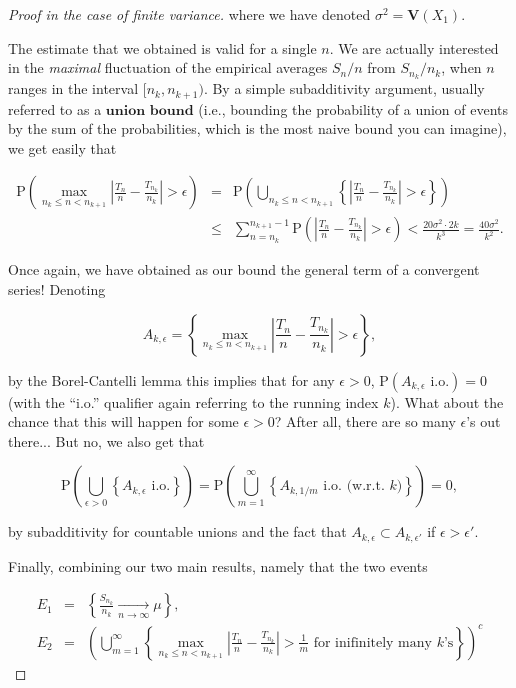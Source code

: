 \documentclass[11pt]{report}
\theoremstyle{plain}
\theoremstyle{definition}
\begin{document}
\begin{proof}[Proof in the case of finite variance]
where we have denoted $\sigma^2=\mathbf{V}(X_1)$.

The estimate that we obtained is valid for a single
$n$. We are actually interested in the \emph{maximal}
fluctuation of the empirical averages $S_n/n$ from
$S_{n_k}/n_k$, when $n$ ranges in the interval
$[n_k,n_{k+1})$. By a simple subadditivity argument,
usually referred to as a $\textbf{union bound}$
(i.e., bounding the probability of a union of events
by the sum of the probabilities, which is the most
naive bound you can imagine), we get easily that

\begin{eqnarray*}
\mathrm{P}\left(\max_{n_k \le n < n_{k+1}} \left| \frac{T_n}{n} - \frac{T_{n_k}}{n_k} \right| > \epsilon \right)
&=&
\mathrm{P}\left(\bigcup_{n_k \le n < n_{k+1}} \left\{\left| \frac{T_n}{n} - \frac{T_{n_k}}{n_k} \right| > \epsilon \right\}\right) \\
&\le& \sum_{n=n_k}^{n_{k+1}-1}
\mathrm{P}\left(\left| \frac{T_n}{n} - \frac{T_{n_k}}{n_k} \right| > \epsilon \right) < \frac{20 \sigma^2\cdot 2k}{k^3}
= \frac{40\sigma^2}{k^2}.
\end{eqnarray*}

Once again, we have obtained as our bound the
general term of a convergent series! Denoting

\[
A_{k,\epsilon} = \left\{ \max_{n_k \le n < n_{k+1}} \left| \frac{T_n}{n} - \frac{T_{n_k}}{n_k} \right| > \epsilon
\right\},
\]

by the Borel-Cantelli lemma this implies that for
any $\epsilon>0$,
$\mathrm{P}(A_{k,\epsilon}\textrm{ i.o.})=0$ (with
the ``i.o.'' qualifier again referring to the running
index $k$). What about the chance that this will
happen for some $\epsilon>0$? After all, there are so
many $\epsilon$'s out there... But no, we also get
that

\[
\mathrm{P}\left(\bigcup_{\epsilon>0} \left\{ A_{k,\epsilon}\textrm{ i.o.} \right\} \right) =
\mathrm{P}\left( \bigcup_{m=1}^\infty \left\{ A_{k,1/m}\textrm{ i.o. (w.r.t. } k \textrm{)}\right\} \right) = 0,
\]

by subadditivity for countable unions and the fact
that $A_{k,\epsilon} \subset A_{k,\epsilon'}$ if
$\epsilon>\epsilon'$.

Finally, combining our two main results, namely that
the two events

\begin{eqnarray*}
E_1 &=& \left\{ \frac{S_{n_k}}{n_k} \xrightarrow[n\to\infty]{} \mu \right\},
\\
E_2 &=& \left( \bigcup_{m=1}^\infty \left\{
\max_{n_k\le n< n_{k+1}} \left|\frac{T_n}{n}-\frac{T_{n_k}}{n_k} \right| > \frac{1}{m}
\textrm{ for inifinitely many } k \textrm{'s}
\right\}
\right)^c
\end{eqnarray*}


\end{proof}
\end{document}

